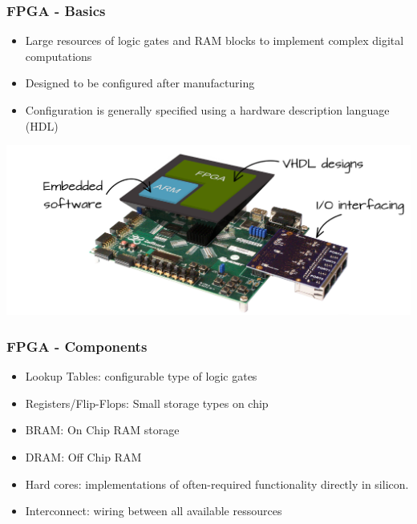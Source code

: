 \documentclass{beamer}
\begin{document}
\begin{frame}
	\frametitle{FPGA - Basics}
	\begin{itemize}
		\item Large resources of logic gates and RAM blocks to implement complex digital computations
		\item Designed to be configured after manufacturing
		\item Configuration is generally specified using a hardware description language (HDL)
	\end{itemize}
\includegraphics[width=1.0\textwidth]{img/fpga.jpg}
\end{frame}

\begin{frame}
	\frametitle{FPGA - Components}
	\begin{itemize}
		\item Lookup Tables: configurable type of logic gates
		\item Registers/Flip-Flops: Small storage types on chip
		\item BRAM: On Chip RAM storage
		\item DRAM: Off Chip RAM
		\item Hard cores: implementations of often-required functionality directly in silicon.
		\item Interconnect: wiring between all available ressources
	\end{itemize}
\end{frame}
\end{document}
